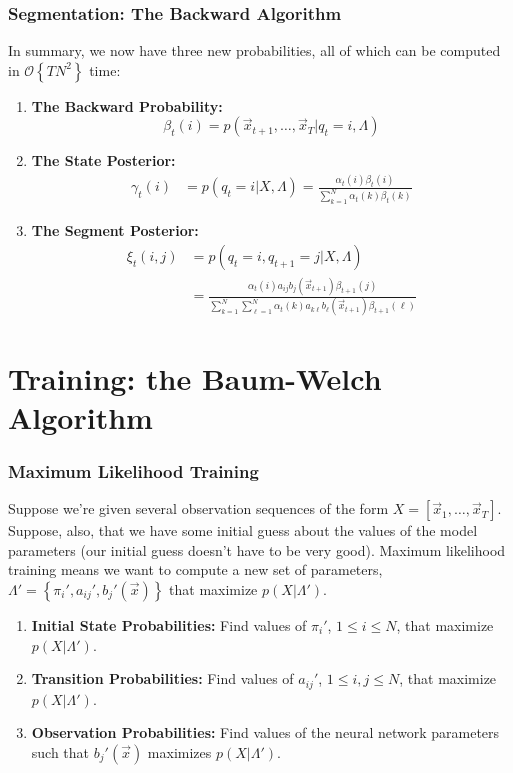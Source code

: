 \documentclass{beamer}
\begin{document}
\begin{frame}
  \frametitle{Segmentation: The Backward Algorithm}

  In summary, we now have three new probabilities, all of which can be
  computed in ${\mathcal O}\left\{TN^2\right\}$ time:
  \begin{enumerate}
  \item {\bf The Backward Probability:}
    \[
    \beta_t(i) = p(\vec{x}_{t+1},\ldots,\vec{x}_T|q_t=i,\Lambda)
    \]
  \item {\bf The State Posterior:}
    \begin{align*}
      \gamma_t(i) & = p(q_t=i|X,\Lambda)
      = \frac{\alpha_t(i)\beta_t(i)}{\sum_{k=1}^N\alpha_t(k)\beta_t(k)}
    \end{align*}
  \item {\bf The Segment Posterior:}
    \begin{align*}
      \xi_t(i,j) & = p(q_t=i,q_{t+1}=j|X,\Lambda)\\
      &= \frac{\alpha_t(i)a_{ij}b_j(\vec{x}_{t+1})\beta_{t+1}(j)}{\sum_{k=1}^N\sum_{\ell=1}^N\alpha_t(k)a_{k\ell}b_\ell(\vec{x}_{t+1})\beta_{t+1}(\ell)}
    \end{align*}
  \end{enumerate}
\end{frame}

\section[Training]{Training: the Baum-Welch Algorithm}
\setcounter{subsection}{1}

\begin{frame}
  \frametitle{Maximum Likelihood Training}
  
  Suppose we're given several observation sequences of the form
  $X=[\vec{x}_1,\ldots,\vec{x}_T]$.  Suppose, also, that we have some
  initial guess about the values of the model parameters (our initial
  guess doesn't have to be very good).  Maximum likelihood training
  means we want to compute a new set of parameters,
  $\Lambda'=\left\{\pi_i',a_{ij}',b_j'(\vec{x})\right\}$ that maximize
  $p(X|\Lambda')$.
  \begin{enumerate}
  \item {\bf Initial State Probabilities:} Find values of $\pi_i'$, $1\le
    i\le N$, that maximize $p(X|\Lambda')$.
  \item {\bf Transition Probabilities:} Find values of $a_{ij}'$, $1\le
    i,j\le N$, that maximize $p(X|\Lambda')$.
  \item {\bf Observation Probabilities:} Find values of the neural
    network parameters such that $b_j'(\vec{x})$ maximizes $p(X|\Lambda')$.
  \end{enumerate}
\end{frame}
  
\end{document}
